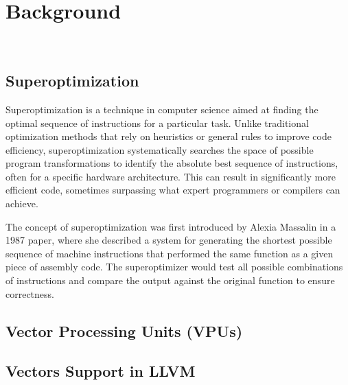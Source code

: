 
\chapter{Background}


\


\section{Superoptimization}


Superoptimization is a technique in computer science aimed at finding
the optimal sequence of instructions for a particular task. Unlike
traditional optimization methods that rely on heuristics or general
rules to improve code efficiency, superoptimization systematically
searches the space of possible program transformations to identify the
absolute best sequence of instructions, often for a specific hardware
architecture. This can result in significantly more efficient code,
sometimes surpassing what expert programmers or compilers can achieve.


The concept of superoptimization was first introduced by Alexia
Massalin in a 1987 paper, where she described a system for generating
the shortest possible sequence of machine instructions that performed
the same function as a given piece of assembly code. The
superoptimizer would test all possible combinations of instructions
and compare the output against the original function to ensure
correctness.

\section{Vector Processing Units (VPUs)}


\section{Vectors Support in LLVM}




